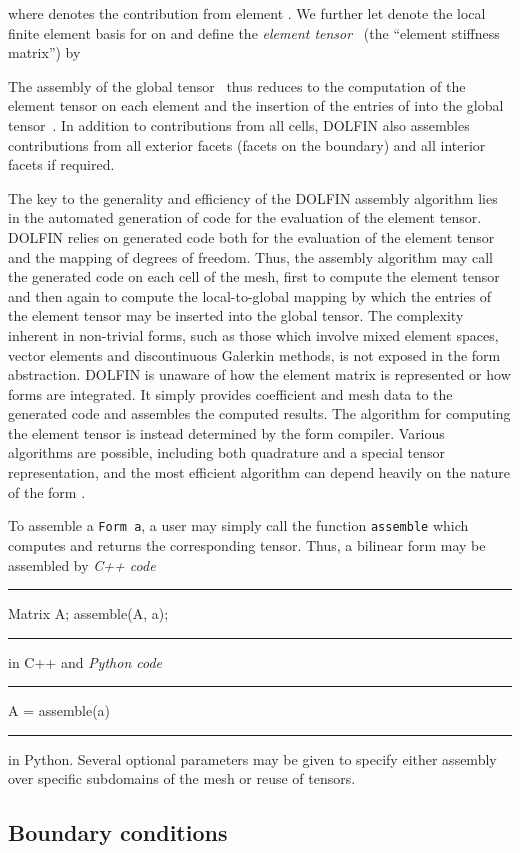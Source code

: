 \documentclass[acmtoms]{acmtrans2m}
\newenvironment{pythoncode}[1]{\center\minipage{#1\textwidth}\footnotesize\hfill\it Python code \rm\vspace{0.1cm}\hrule\renewcommand{\baselinestretch}{0.9}\footnotesize\verbatim}{\endverbatim\hrule\normalsize\endminipage\newline\endcenter}
\newenvironment{cppcode}[1]{\center\minipage{#1\textwidth}\footnotesize\hfill\it C++ code \rm\vspace{0.1cm}\hrule\renewcommand{\baselinestretch}{0.9}\footnotesize\verbatim}{\endverbatim\hrule\normalsize\endminipage\newline\endcenter}
\newcommand{\emp}[1]{\texttt{#1}}
\newcommand{\dolfin}{DOLFIN}
\begin{document}
where  denotes the contribution from element . We further let
 denote the local finite element basis
for  on  and define the \emph{element tensor}~ (the
``element stiffness matrix'') by

The assembly of the global tensor~ thus reduces to the computation
of the element tensor  on each element  and the insertion of
the entries of  into the global tensor~.
In addition to contributions from all cells, \dolfin{} also assembles
contributions from all exterior facets (facets on the boundary)
and all interior facets if required.

The key to the generality and efficiency of the \dolfin{} assembly
algorithm lies in the automated generation of code for the evaluation
of the element tensor. \dolfin{} relies on generated code both for the
evaluation of the element tensor and the mapping of degrees of
freedom. Thus, the assembly algorithm may call the generated code on
each cell of the mesh, first to compute the element tensor and then
again to compute the local-to-global mapping by which the entries of
the element tensor may be inserted into the global tensor.
The complexity inherent in non-trivial forms, such as those which involve
mixed element spaces, vector elements and discontinuous Galerkin methods,
is not
exposed in the form abstraction. \dolfin{} is unaware of how the
element matrix is represented or how forms are integrated. It simply
provides coefficient and mesh data to the generated code and assembles
the computed results. The algorithm for computing the element tensor
is instead determined by the form compiler. Various algorithms are
possible, including both quadrature and a special tensor
representation, and the most efficient algorithm can depend heavily on
the nature of the form \cite{kirby:2006,oelgaard:2009}.

To assemble a \emp{Form~a}, a user may simply call the function
\emp{assemble} which computes and returns the corresponding tensor.
Thus, a bilinear form may be assembled by
\begin{cppcode}{0.9}
  Matrix A;
  assemble(A, a);
\end{cppcode}
in C++ and
\begin{pythoncode}{0.9}
  A = assemble(a)
\end{pythoncode}
in Python. Several optional parameters may be given to specify either
assembly over specific subdomains of the mesh or reuse of tensors.

\subsection{Boundary conditions}
\end{document}
